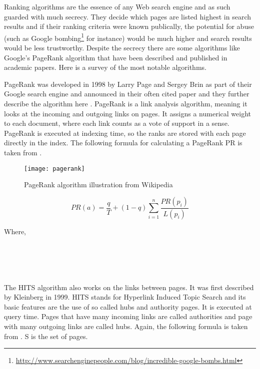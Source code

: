 Ranking algorithms are the essence of any Web search engine and as such guarded with much secrecy. They decide which pages are listed highest in search results and if their ranking criteria were known publically, the potential for abuse (such as Google bombing\footnote{\url{http://www.searchenginepeople.com/blog/incredible-google-bombs.html}} for instance) would be much higher and search results would be less trustworthy. Despite the secrecy there are some algorithms like Google's PageRank algorithm that have been described and published in academic papers. Here is a survey of the most notable algorithms.

PageRank was developed in 1998 by Larry Page and Sergey Brin as part of their Google search engine and announced in their often cited paper \autocite{Brin1998b} and they further describe the algorithm here \autocite{Brin1998}. PageRank is a link analysis algorithm, meaning it looks at the incoming and outgoing links on pages. It assigns a numerical weight to each document, where each link counts as a vote of support in a sense. PageRank is executed at indexing time, so the ranks are stored with each page directly in the index. The following formula for calculating a PageRank PR is taken from \autocite[p.472]{Baeza-Yates2011}.

\begin{figure}[!htbp] %
  \centering
  \texttt{[image: pagerank]}
\caption[PageRank algorithm]{PageRank algorithm illustration from Wikipedia}
\label{fig:pagerank2}
\end{figure}

\begin{equation}
  PR(a) =
  \frac{q}{T} + (1 - q)
  \sum_{i=1}^{n} \frac{PR(p_i)}{L(p_i)}
  \label{eq:PRt}
\end{equation}

Where,\\
 \\
 \\
 \\
 \\
\itab{} 

The HITS algorithm also works on the links between pages. It was first described by Kleinberg \autocite[p.472]{Kleinberg1999, Kleinberg} in 1999. HITS stands for Hyperlink Induced Topic Search and its basic features are the use of so called hubs and authority pages. It is executed at query time. Pages that have many incoming links are called authorities and page with many outgoing links are called hubs. Again, the following formula is taken from \autocite[p.471]{Baeza-Yates2011}. S is the set of pages.

